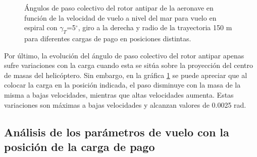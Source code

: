 \begin{figure}
	\centering
	\caption{Ángulos de paso colectivo del rotor antipar de la aeronave en función de la velocidad de vuelo a nivel del mar para vuelo en espiral con $\gamma_T$=5$^\circ$, giro a la derecha y radio de la trayectoria 150 m para diferentes cargas de pago en posiciones distintas.}
	\label{Theta0VEraMPL}
\end{figure}

Por último, la evolución del ángulo de paso colectivo del rotor antipar apenas sufre variaciones con la carga cuando esta se sitúa sobre la proyección del centro de masas del helicóptero. Sin embargo, en la gráfica \ref{Theta0VEraMPL} se puede apreciar que al colocar la carga en la posición indicada, el paso disminuye con la masa de la misma a bajas velocidades, mientras que altas velocidades aumenta. Estas variaciones son máximas a bajas velocidades y alcanzan valores de 0.0025 rad.

\subsection*{Análisis de los parámetros de vuelo con la posición de la carga de pago}

